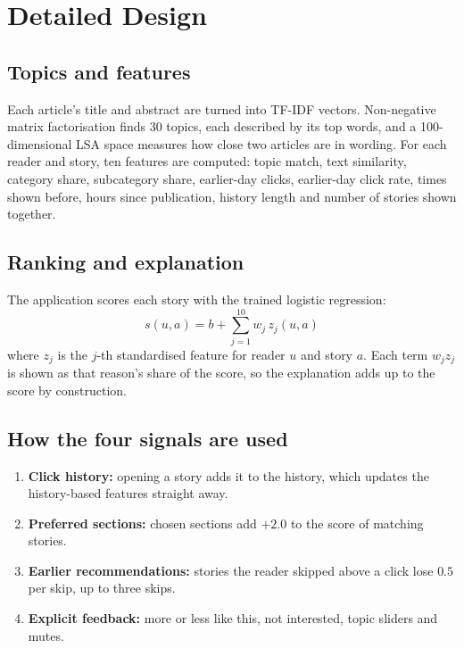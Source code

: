 \documentclass[12pt,a4paper,oneside]{report}
\begin{document}
\section{Detailed Design}

\subsection{Topics and features}
Each article's title and abstract are turned into TF-IDF vectors. Non-negative matrix factorisation
finds 30 topics, each described by its top words, and a 100-dimensional LSA space measures how close two
articles are in wording. For each reader and story, ten features are computed: topic match, text
similarity, category share, subcategory share, earlier-day clicks, earlier-day click rate, times shown
before, hours since publication, history length and number of stories shown together.

\subsection{Ranking and explanation}
The application scores each story with the trained logistic regression:
\begin{equation}
  s(u,a) = b + \sum_{j=1}^{10} w_j\, z_j(u,a)
\end{equation}
where $z_j$ is the $j$-th standardised feature for reader $u$ and story $a$. Each term $w_j z_j$ is shown as
that reason's share of the score, so the explanation adds up to the score by construction.

\subsection{How the four signals are used}
\begin{enumerate}
  \item \textbf{Click history:} opening a story adds it to the history, which updates the history-based
        features straight away.
  \item \textbf{Preferred sections:} chosen sections add $+2.0$ to the score of matching stories.
  \item \textbf{Earlier recommendations:} stories the reader skipped above a click lose $0.5$ per skip,
        up to three skips.
  \item \textbf{Explicit feedback:} more or less like this, not interested, topic sliders and mutes.
\end{enumerate}
\end{document}
